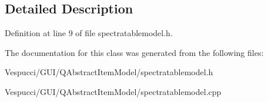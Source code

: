 \subsection{Detailed Description}


Definition at line 9 of file spectratablemodel.\+h.



The documentation for this class was generated from the following files\+:\begin{DoxyCompactItemize}
\item 
Vespucci/\+G\+U\+I/\+Q\+Abstract\+Item\+Model/spectratablemodel.\+h\item 
Vespucci/\+G\+U\+I/\+Q\+Abstract\+Item\+Model/spectratablemodel.\+cpp\end{DoxyCompactItemize}
